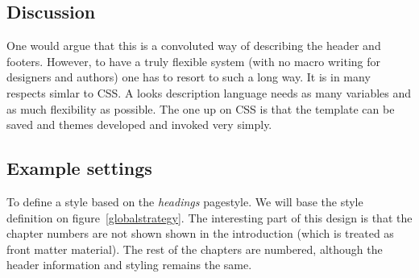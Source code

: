 %
%
%
%
%
%

\subsection{Discussion}

One would argue that this is a convoluted way of describing the header and footers. However, to have a truly flexible system (with no macro writing for designers and authors) one has to resort to such a long way. It is in many respects simlar to CSS. A looks description language needs as many variables and as much flexibility as possible. The one up on CSS is that the template can be saved and themes developed and invoked very simply.

\subsection{Example settings}

To define a style based on the \textit{headings} pagestyle. We will base the style definition on figure~\ref{globalstrategy}. The interesting part of this design is that the chapter numbers are not shown shown in the introduction (which is treated as front matter material). The rest of the chapters are numbered, although the header information and styling remains the same.

